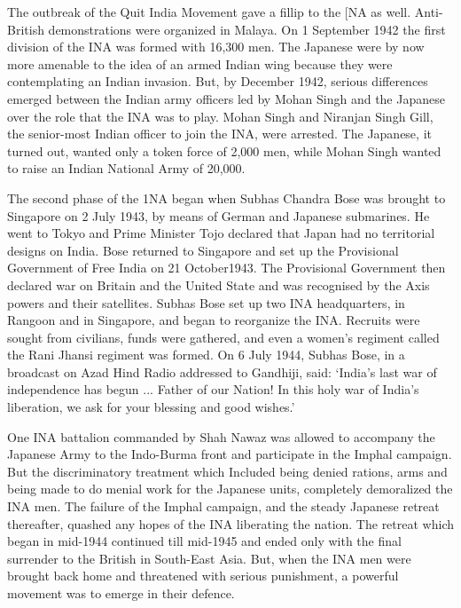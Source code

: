 The outbreak of the Quit India Movement gave a fillip to the [NA as well. Anti-British demonstrations were organized in Malaya. On 1 September 1942 the first division of the INA was formed with 16,300 men. The Japanese were by now more amenable to the idea of an armed Indian wing because they were contemplating an Indian invasion. But, by December 1942, serious differences emerged between the Indian army officers led by Mohan Singh and the Japanese over the role that the INA was to play. Mohan Singh and Niranjan Singh Gill, the senior-most Indian officer to join the INA, were arrested. The Japanese, it turned out, wanted only a token force of 2,000 men, while Mohan Singh wanted to raise an Indian National Army of 20,000.

The second phase of the 1NA began when Subhas Chandra Bose was brought to Singapore on 2 July 1943, by means of German and Japanese submarines. He went to Tokyo and Prime Minister Tojo declared that Japan had no territorial designs on India. Bose returned to Singapore and set up the Provisional Government of Free India on 21 October1943. The Provisional Government then declared war on Britain and the United State and was recognised by the Axis powers and their satellites. Subhas Bose set up two INA headquarters, in Rangoon and in Singapore, and began to reorganize the INA. Recruits were sought from civilians, funds were gathered, and even a women's regiment called the Rani Jhansi regiment was formed. On 6 July 1944, Subhas Bose, in a broadcast on Azad Hind Radio addressed to Gandhiji, said: `India's last war of independence has begun ... Father of our Nation! In this holy war of India's liberation, we ask for your blessing and good wishes.'

One INA battalion commanded by Shah Nawaz was allowed to accompany the Japanese Army to the Indo-Burma front and participate in the Imphal campaign. But the discriminatory treatment which Included being denied rations, arms and being made to do menial work for the Japanese units, completely demoralized the INA men. The failure of the Imphal campaign, and the steady Japanese retreat thereafter, quashed any hopes of the INA liberating the nation. The retreat which began in mid-1944 continued till mid-1945 and ended only with the final surrender to the British in South-East Asia. But, when the INA men were brought back home and threatened with serious punishment, a powerful movement was to emerge in their defence.
